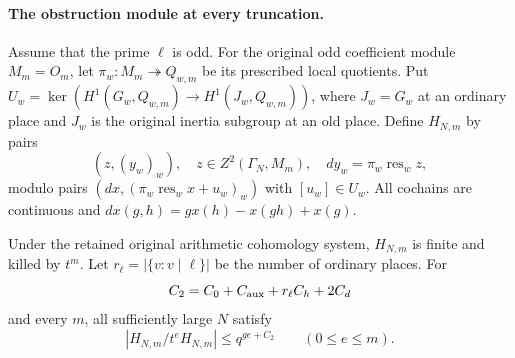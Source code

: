 \paragraph{The obstruction module at every truncation.}
Assume that the prime $\ell$ is odd. For the original odd
coefficient module $M_m=O_m$, let
$\pi_w:M_m\twoheadrightarrow Q_{w,m}$ be its prescribed local
quotients. Put
$U_w=\ker(H^1(G_w,Q_{w,m})\to H^1(J_w,Q_{w,m}))$,
where $J_w=G_w$ at an ordinary place and $J_w$ is the original
inertia subgroup at an old place. Define $H_{N,m}$ by pairs
\[
 (z,(y_w)_w),\quad z\in Z^2(\Gamma_N,M_m),\quad
 dy_w=\pi_w\operatorname{res}_wz,
\]
modulo pairs $(dx,(\pi_w\operatorname{res}_wx+u_w)_w)$ with
$[u_w]\in U_w$. All cochains are continuous and
$dx(g,h)=g x(h)-x(gh)+x(g)$.

\begin{proposition}
\label{prop:selmer-obstruction-quotients}
Under the retained original arithmetic cohomology system,
$H_{N,m}$ is finite and killed by $t^m$. Let
$r_\ell=|\{v:v\mid\ell\}|$ be the number of ordinary places. For
\[
C_2=C_0+C_{\rm aux}+r_\ell C_h+2C_d
\]
and every $m$, all sufficiently large $N$ satisfy
\[
              |H_{N,m}/t^eH_{N,m}|\leq q^{ge+C_2}
                    \qquad(0\leq e\leq m).
\]
\end{proposition}

